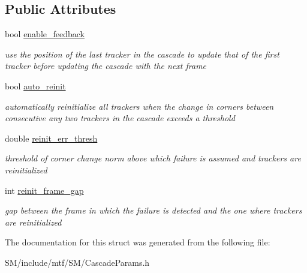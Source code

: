 \subsection*{Public Attributes}
\begin{DoxyCompactItemize}
\item 
\hypertarget{structCascadeParams_a1132f7cd5f0d13f2fe9f2a0ae2b9c907}{bool \hyperlink{structCascadeParams_a1132f7cd5f0d13f2fe9f2a0ae2b9c907}{enable\-\_\-feedback}}\label{structCascadeParams_a1132f7cd5f0d13f2fe9f2a0ae2b9c907}

\begin{DoxyCompactList}\small\item\em use the position of the last tracker in the cascade to update that of the first tracker before updating the cascade with the next frame \end{DoxyCompactList}\item 
\hypertarget{structCascadeParams_a632ed34d7745e9c0c2164e7bca07a07d}{bool \hyperlink{structCascadeParams_a632ed34d7745e9c0c2164e7bca07a07d}{auto\-\_\-reinit}}\label{structCascadeParams_a632ed34d7745e9c0c2164e7bca07a07d}

\begin{DoxyCompactList}\small\item\em automatically reinitialize all trackers when the change in corners between consecutive any two trackers in the cascade exceeds a threshold \end{DoxyCompactList}\item 
\hypertarget{structCascadeParams_ac67600e34dc88745e25be88676fa9657}{double \hyperlink{structCascadeParams_ac67600e34dc88745e25be88676fa9657}{reinit\-\_\-err\-\_\-thresh}}\label{structCascadeParams_ac67600e34dc88745e25be88676fa9657}

\begin{DoxyCompactList}\small\item\em threshold of corner change norm above which failure is assumed and trackers are reinitialized \end{DoxyCompactList}\item 
\hypertarget{structCascadeParams_aea9dc6606b0b68839b6130a9dcf511e4}{int \hyperlink{structCascadeParams_aea9dc6606b0b68839b6130a9dcf511e4}{reinit\-\_\-frame\-\_\-gap}}\label{structCascadeParams_aea9dc6606b0b68839b6130a9dcf511e4}

\begin{DoxyCompactList}\small\item\em gap between the frame in which the failure is detected and the one where trackers are reinitialized \end{DoxyCompactList}\end{DoxyCompactItemize}


The documentation for this struct was generated from the following file\-:\begin{DoxyCompactItemize}
\item 
S\-M/include/mtf/\-S\-M/Cascade\-Params.\-h\end{DoxyCompactItemize}
